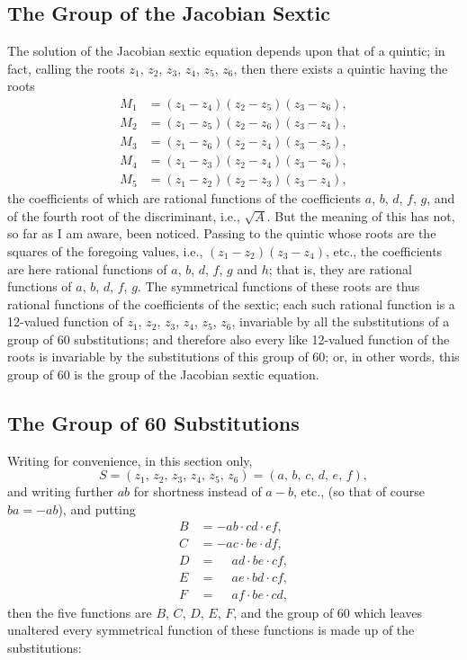 \documentclass[11pt,a4paper]{article}
\theoremstyle{cayley}
\begin{document}
\subsection*{The Group of the Jacobian Sextic}

The solution of the Jacobian sextic equation depends upon that of a quintic; in fact, calling the roots $z_{1}$, $z_{2}$, $z_{3}$, $z_{4}$, $z_{5}$, $z_{6}$, then there exists a quintic having the roots
\begin{align*}
M_{1} &= (z_{1}-z_{4})(z_{2}-z_{5})(z_{3}-z_{6}),\\
M_{2} &= (z_{1}-z_{5})(z_{2}-z_{6})(z_{3}-z_{4}),\\
M_{3} &= (z_{1}-z_{6})(z_{2}-z_{4})(z_{3}-z_{5}),\\
M_{4} &= (z_{1}-z_{3})(z_{2}-z_{4})(z_{3}-z_{6}),\\
M_{5} &= (z_{1}-z_{2})(z_{2}-z_{3})(z_{3}-z_{4}),
\end{align*}
the coefficients of which are rational functions of the coefficients $a$, $b$, $d$, $f$, $g$, and of the fourth root of the discriminant, i.e., $\sqrt{A}$. But the meaning of this has not, so far as I am aware, been noticed. Passing to the quintic whose roots are the squares of the foregoing values, i.e., $(z_{1}-z_{2})(z_{3}-z_{4})$, etc., the coefficients are here rational functions of $a$, $b$, $d$, $f$, $g$ and $h$; that is, they are rational functions of $a$, $b$, $d$, $f$, $g$. The symmetrical functions of these roots are thus rational functions of the coefficients of the sextic; each such rational function is a 12-valued function of $z_{1}$, $z_{2}$, $z_{3}$, $z_{4}$, $z_{5}$, $z_{6}$, invariable by all the substitutions of a group of 60 substitutions; and therefore also every like 12-valued function of the roots is invariable by the substitutions of this group of 60; or, in other words, this group of 60 is the group of the Jacobian sextic equation.

\subsection*{The Group of 60 Substitutions}

Writing for convenience, in this section only,
\[
S = (z_{1},\, z_{2},\, z_{3},\, z_{4},\, z_{5},\, z_{6}) = (a,\, b,\, c,\, d,\, e,\, f),
\]
and writing further $ab$ for shortness instead of $a-b$, etc., (so that of course $ba = -ab$), and putting
\begin{align*}
B &= -ab \cdot cd \cdot ef,\\
C &= -ac \cdot be \cdot df,\\
D &= \phantom{-}ad \cdot be \cdot cf,\\
E &= \phantom{-}ae \cdot bd \cdot cf,\\
F &= \phantom{-}af \cdot be \cdot cd,
\end{align*}
then the five functions are $B$, $C$, $D$, $E$, $F$, and the group of 60 which leaves unaltered every symmetrical function of these functions is made up of the substitutions:
\end{document}
